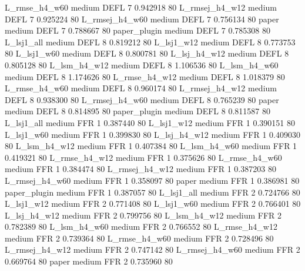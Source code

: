  L_rmse_h4_w60     medium     DEFL                 7 0.942918 80
L_rmsej_h4_w12     medium     DEFL                 7 0.925224 80
L_rmsej_h4_w60     medium     DEFL                 7 0.756134 80
         paper     medium     DEFL                 7 0.788667 80
  paper_plugin     medium     DEFL                 7 0.785308 80
    L_lsj1_all     medium     DEFL                 8 0.819212 80
    L_lsj1_w12     medium     DEFL                 8 0.773753 80
    L_lsj1_w60     medium     DEFL                 8 0.800781 80
  L_lsj_h4_w12     medium     DEFL                 8 0.805128 80
  L_lsm_h4_w12     medium     DEFL                 8 1.106536 80
  L_lsm_h4_w60     medium     DEFL                 8 1.174626 80
 L_rmse_h4_w12     medium     DEFL                 8 1.018379 80
 L_rmse_h4_w60     medium     DEFL                 8 0.960174 80
L_rmsej_h4_w12     medium     DEFL                 8 0.938300 80
L_rmsej_h4_w60     medium     DEFL                 8 0.765239 80
         paper     medium     DEFL                 8 0.814895 80
  paper_plugin     medium     DEFL                 8 0.811587 80
    L_lsj1_all     medium      FFR                 1 0.387440 80
    L_lsj1_w12     medium      FFR                 1 0.390151 80
    L_lsj1_w60     medium      FFR                 1 0.399830 80
  L_lsj_h4_w12     medium      FFR                 1 0.409030 80
  L_lsm_h4_w12     medium      FFR                 1 0.407384 80
  L_lsm_h4_w60     medium      FFR                 1 0.419321 80
 L_rmse_h4_w12     medium      FFR                 1 0.375626 80
 L_rmse_h4_w60     medium      FFR                 1 0.384474 80
L_rmsej_h4_w12     medium      FFR                 1 0.387203 80
L_rmsej_h4_w60     medium      FFR                 1 0.358097 80
         paper     medium      FFR                 1 0.386981 80
  paper_plugin     medium      FFR                 1 0.387057 80
    L_lsj1_all     medium      FFR                 2 0.724766 80
    L_lsj1_w12     medium      FFR                 2 0.771408 80
    L_lsj1_w60     medium      FFR                 2 0.766401 80
  L_lsj_h4_w12     medium      FFR                 2 0.799756 80
  L_lsm_h4_w12     medium      FFR                 2 0.782389 80
  L_lsm_h4_w60     medium      FFR                 2 0.766552 80
 L_rmse_h4_w12     medium      FFR                 2 0.739364 80
 L_rmse_h4_w60     medium      FFR                 2 0.728496 80
L_rmsej_h4_w12     medium      FFR                 2 0.747142 80
L_rmsej_h4_w60     medium      FFR                 2 0.669764 80
         paper     medium      FFR                 2 0.735960 80
